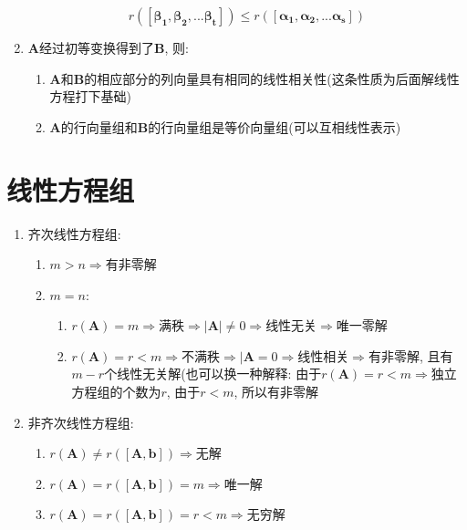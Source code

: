 \begin{enumerate}
\begin{equation*}
r([\bm{\beta_{1}},\bm{\beta_{2}},...\bm{\beta_{t}}])\le r([\bm{\alpha_{1}},\bm{\alpha_{2}},...\bm{\alpha_{s}}])
\end{equation*}
\item $\bm{A}$经过初等变换得到了$\bm{B}$, 则:
\begin{enumerate}
\item $\bm{A}$和$\bm{B}$的相应部分的列向量具有相同的线性相关性(这条性质为后面解线性方程打下基础)
\item $\bm{A}$的行向量组和$\bm{B}$的行向量组是等价向量组(可以互相线性表示)
\end{enumerate}
\end{enumerate}
\chapter{线性方程组}
\begin{enumerate}
\item 齐次线性方程组:
\begin{enumerate}
\item $m>n\Rightarrow $有非零解
\item $m=n$:
\begin{enumerate}
\item $r(\bm{A})=m\Rightarrow$满秩$\Rightarrow |\bm{A}|\neq 0 \Rightarrow$线性无关$\Rightarrow$唯一零解
\item $r(\bm{A})=r<m\Rightarrow$不满秩$\Rightarrow |\bm{A}=0\Rightarrow$线性相关$\Rightarrow$有非零解, 且有$m-r$个线性无关解(也可以换一种解释: 由于$r(\bm{A})=r<m\Rightarrow$独立方程组的个数为$r$, 由于$r<m$, 所以有非零解
\end{enumerate}
\end{enumerate}
\item 非齐次线性方程组:
\begin{enumerate}
\item $r(\bm{A})\neq r([\bm{A},\bm{b}])\Rightarrow$无解
\item $r(\bm{A})=r([\bm{A},\bm{b}])=m\Rightarrow$唯一解
\item $r(\bm{A})=r([\bm{A},\bm{b}])=r<m\Rightarrow$无穷解
\end{enumerate}
\end{enumerate}